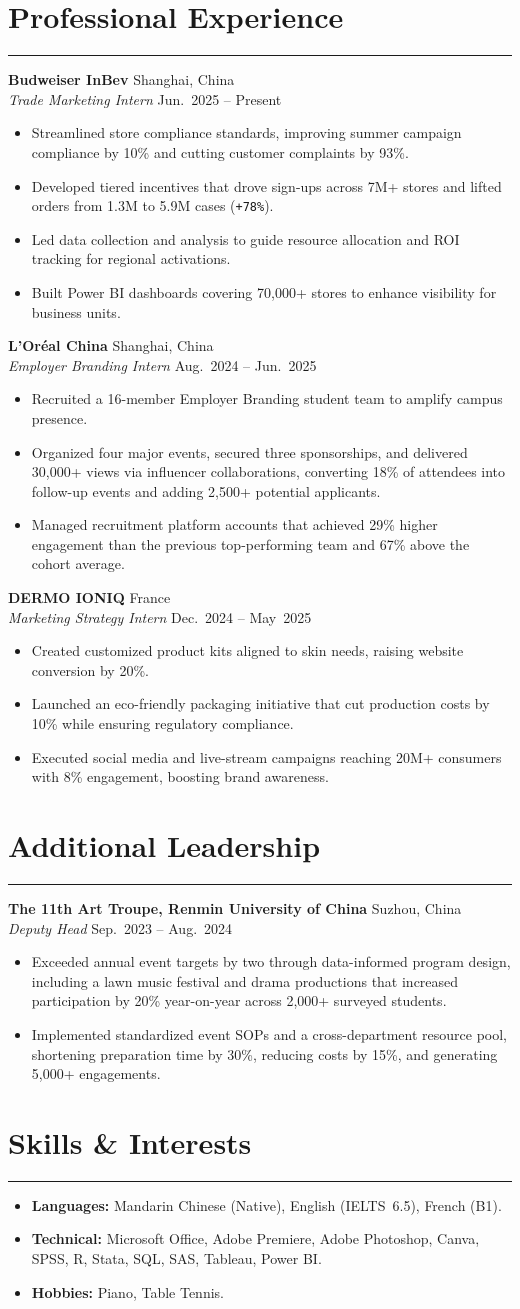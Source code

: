 \documentclass[11pt,a4paper]{article}
\newcommand{\resumeSection}[1]{\section*{#1}\vspace{-0.5em}\hrule\vspace{0.6em}}
\newcommand{\resumeSubsection}[4]{
  \textbf{#1} \hfill {#2}\\
  \textit{#3} \hfill {#4}
}
\newcommand{\resumeItem}[1]{\item #1}
\begin{document}
\resumeSection{Professional Experience}
\resumeSubsection{Budweiser InBev}{Shanghai, China}{Trade Marketing Intern}{Jun.~2025 -- Present}
\begin{itemize}
  \resumeItem{Streamlined store compliance standards, improving summer campaign compliance by 10\% and cutting customer complaints by 93\%.}
  \resumeItem{Developed tiered incentives that drove sign-ups across 7M+ stores and lifted orders from 1.3M to 5.9M cases (\texttt{+78\%}).}
  \resumeItem{Led data collection and analysis to guide resource allocation and ROI tracking for regional activations.}
  \resumeItem{Built Power BI dashboards covering 70,000+ stores to enhance visibility for business units.}
\end{itemize}
\vspace{0.4em}
\resumeSubsection{L'Or\'eal China}{Shanghai, China}{Employer Branding Intern}{Aug.~2024 -- Jun.~2025}
\begin{itemize}
  \resumeItem{Recruited a 16-member Employer Branding student team to amplify campus presence.}
  \resumeItem{Organized four major events, secured three sponsorships, and delivered 30,000+ views via influencer collaborations, converting 18\% of attendees into follow-up events and adding 2,500+ potential applicants.}
  \resumeItem{Managed recruitment platform accounts that achieved 29\% higher engagement than the previous top-performing team and 67\% above the cohort average.}
\end{itemize}
\vspace{0.4em}
\resumeSubsection{DERMO IONIQ}{France}{Marketing Strategy Intern}{Dec.~2024 -- May~2025}
\begin{itemize}
  \resumeItem{Created customized product kits aligned to skin needs, raising website conversion by 20\%.}
  \resumeItem{Launched an eco-friendly packaging initiative that cut production costs by 10\% while ensuring regulatory compliance.}
  \resumeItem{Executed social media and live-stream campaigns reaching 20M+ consumers with 8\% engagement, boosting brand awareness.}
\end{itemize}

\resumeSection{Additional Leadership}
\resumeSubsection{The 11th Art Troupe, Renmin University of China}{Suzhou, China}{Deputy Head}{Sep.~2023 -- Aug.~2024}
\begin{itemize}
  \resumeItem{Exceeded annual event targets by two through data-informed program design, including a lawn music festival and drama productions that increased participation by 20\% year-on-year across 2,000+ surveyed students.}
  \resumeItem{Implemented standardized event SOPs and a cross-department resource pool, shortening preparation time by 30\%, reducing costs by 15\%, and generating 5,000+ engagements.}
\end{itemize}

\resumeSection{Skills \& Interests}
\begin{itemize}[leftmargin=1.2em]
  \resumeItem{\textbf{Languages:} Mandarin Chinese (Native), English (IELTS~6.5), French (B1).}
  \resumeItem{\textbf{Technical:} Microsoft Office, Adobe Premiere, Adobe Photoshop, Canva, SPSS, R, Stata, SQL, SAS, Tableau, Power BI.}
  \resumeItem{\textbf{Hobbies:} Piano, Table Tennis.}
\end{itemize}
\end{document}
